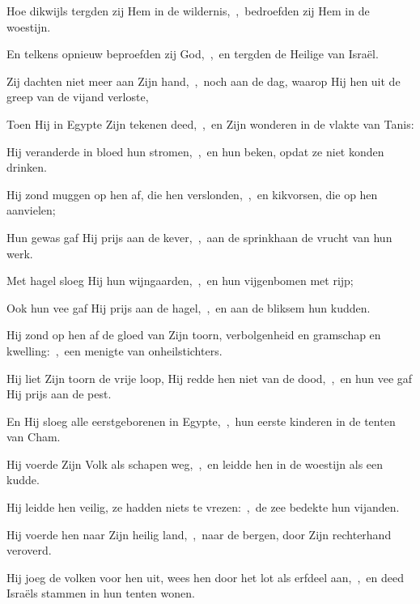 \documentclass[12pt,twoside,a5paper]{article}
\begin{document}
\begin{halfparskip}

  Hoe dikwijls tergden zij Hem in de wildernis,~\sep\ bedroefden zij Hem in de woestijn.

  En telkens opnieuw beproefden zij God,~\sep\ en tergden de Heilige van Israël.

  Zij dachten niet meer aan Zijn hand,~\sep\ noch aan de dag, waarop Hij hen uit de greep van de vijand verloste,

  Toen Hij in Egypte Zijn tekenen deed,~\sep\ en Zijn wonderen in de vlakte van Tanis:

  Hij veranderde in bloed hun stromen,~\sep\ en hun beken, opdat ze niet konden drinken.

  Hij zond muggen op hen af, die hen verslonden,~\sep\ en kikvorsen, die op hen aanvielen;

  Hun gewas gaf Hij prijs aan de kever,~\sep\ aan de sprinkhaan de vrucht van hun werk.

  Met hagel sloeg Hij hun wijngaarden,~\sep\ en hun vijgenbomen met rijp;

  Ook hun vee gaf Hij prijs aan de hagel,~\sep\ en aan de bliksem hun kudden.

  Hij zond op hen af de gloed van Zijn toorn, verbolgenheid en gramschap en kwelling:~\sep\ een menigte van onheilstichters.

  Hij liet Zijn toorn de vrije loop, Hij redde hen niet van de dood,~\sep\ en hun vee gaf Hij prijs aan de pest.

  En Hij sloeg alle eerstgeborenen in Egypte,~\sep\ hun eerste kinderen in de tenten van Cham.

  Hij voerde Zijn Volk als schapen weg,~\sep\ en leidde hen in de woestijn als een kudde.

  Hij leidde hen veilig, ze hadden niets te vrezen:~\sep\ de zee bedekte hun vijanden.

  Hij voerde hen naar Zijn heilig land,~\sep\ naar de bergen, door Zijn rechterhand veroverd.

  Hij joeg de volken voor hen uit, wees hen door het lot als erfdeel aan,~\sep\ en deed Israëls stammen in hun tenten wonen.
\end{halfparskip}
\end{document}
